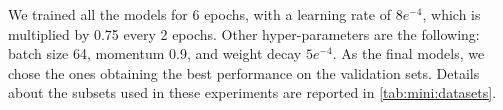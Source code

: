 We trained all the models for 6 epochs, with a learning rate of $8e^{-4}$, which is multiplied by 0.75 every 2 epochs.
Other hyper-parameters are the following: batch size 64, momentum 0.9, and weight decay $5e^{-4}$.
As the final models,  we chose the ones obtaining the best performance on the validation sets.
Details about the subsets used in these experiments are reported in \ref{tab:mini:datasets}.






